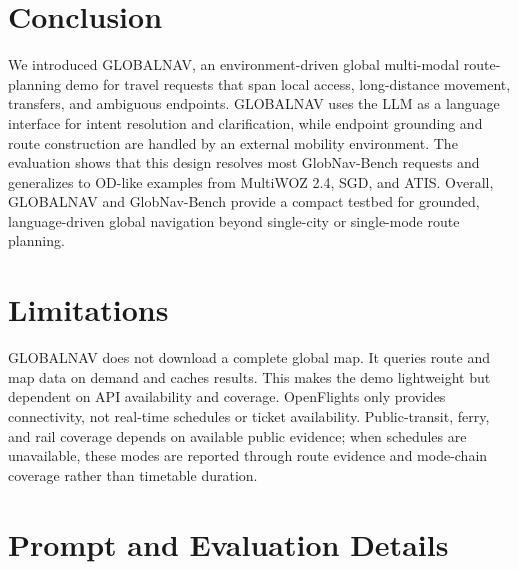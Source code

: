 \documentclass[11pt]{article}
\newcommand{\sys}{GLOBALNAV\xspace}
\newcommand{\bench}{GlobNav-Bench\xspace}
\begin{document}
\section{Conclusion}

We introduced \sys, an environment-driven global multi-modal route-planning demo for travel requests that span local access, long-distance movement, transfers, and ambiguous endpoints. \sys uses the LLM as a language interface for intent resolution and clarification, while endpoint grounding and route construction are handled by an external mobility environment. The evaluation shows that this design resolves most \bench requests and generalizes to OD-like examples from MultiWOZ 2.4, SGD, and ATIS. Overall, \sys and \bench provide a compact testbed for grounded, language-driven global navigation beyond single-city or single-mode route planning.

\section*{Limitations}

\sys does not download a complete global map.
It queries route and map data on demand and caches results.
This makes the demo lightweight but dependent on API availability and coverage. OpenFlights only provides connectivity, not real-time schedules or ticket availability. Public-transit, ferry, and rail coverage depends on available public evidence; when schedules are unavailable, these modes are reported through route evidence and mode-chain coverage rather than timetable duration.







\clearpage
\appendix

\section{Prompt and Evaluation Details}
\label{sec:prompts}
\end{document}
